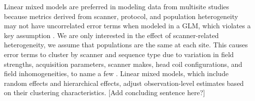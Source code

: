 Linear mixed models are preferred in modeling data from multisite studies because metrics derived from scanner, protocol, and population heterogeneity may not have uncorrelated error terms when modeled in a GLM, which violates a key assumption \cite{garson2013fundamentals}. We are only interested in the effect of scanner-related heterogeneity, we assume that populations are the same at each site. This causes error terms to cluster by scanner and sequence type due to variation in field strengths, acquisition parameters, scanner makes, head coil configurations, and field inhomogeneities, to name a few \cite{cannon2014}. Linear mixed models, which include random effects and hierarchical effects, adjust observation-level estimates based on their clustering characteristics\cite{garson2013fundamentals}. [Add concluding sentence here?]